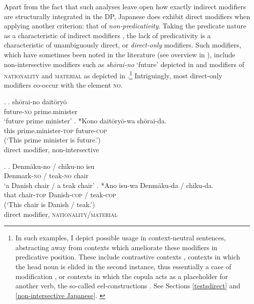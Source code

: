Apart from the fact that such analyses leave open how exactly indirect modifiers are structurally integrated in the DP, Japanese does exhibit direct modifiers when applying another criterion: that of \textit{non-predicativity}. Taking the predicate nature as a characteristic of indirect modifiers \citep{bolinger:1967:adj, alex:2007:nounphrase, cinque:2010:adj, panayidou:2013:in}, the lack of predicativity is a characteristic of unambiguously direct, or \textit{direct-only} modifiers. Such modifiers, which have sometimes been noted in the literature (see overview in \citealt{watanabe:2017:attributive}), include  non-intersective modifiers such as \textit{shōrai-no} `future’ depicted in  and modifiers of \textsc{nationality} and \textsc{material} as depicted in .\footnote{In such examples, I depict possible usage in context-neutral sentences, abstracting away from contexts which ameliorate these modifiers in predicative position. These include contrastive contexts \citep{hoshi:2002:kaynean}, contexts in which the head noun is elided in the second instance, thus essentially a case of modification \citep{nagano:2018:conversion}, or contexts in which the copula acts as a placeholder for another verb, the so-called eel-constructions \citep{okutsu:1978:boku}. See Sections \ref{testsdirect} and \ref{non-intersective Japanese}. \label{foonoteeel}} Intriguingly, most direct-only modifiers co-occur with the element \textsc{no}.

\ex. \label{shorai} \ag. shōrai-no daitōryō\\
future-\textsc{no} prime.minister\\
`future prime minister’
\bg. *Kono daitōryō-wa shōrai-da.\\
this prime.minister-\textsc{top} future-\textsc{cop}\\
(`This prime minister is future.’) \\ \null \hfill direct modifier, non-intersective

\ex. \label{denmaku1} \ag. Denmāku-no / chīku-no isu\\
Denmark-\textsc{no} / teak-\textsc{no} chair\\
`a Danish chair / a teak chair'
\bg. *Ano isu-wa Denmāku-da / chīku-da.\\
that chair-\textsc{top} Danish-\textsc{cop} / teak-\textsc{cop}\\
(`This chair is Danish / teak.’) \\ \null \hfill direct modifier, \textsc{nationality/material}

